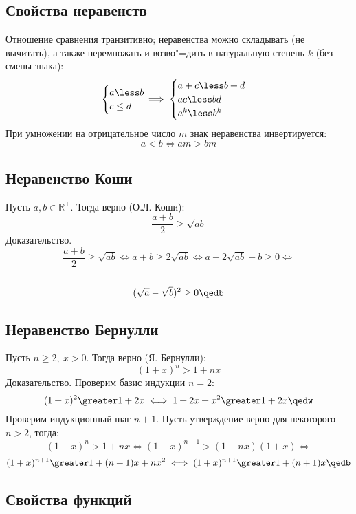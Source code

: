 \subsection{Свойства неравенств}

Отношение сравнения {\ital транзитивно}; неравенства можно {\ital складывать}
{\ital\color{desc}(не вычитать)}, а также {\ital перемножать} и возво"=дить
в натуральную степень $k$ {\ital\color{desc}(без смены знака)}:
$$
\begin{cases}
a\less b\\
c\leq d
\end{cases}\hspace*{-12pt}\implies
\begin{cases}
a + c\less b + d\\
ac\less bd\\
a^k\less b^k
\end{cases}
$$
При умножении на отрицательное число $m$ знак неравенства {\ital инвертируется}:
$$a\less b\iff am\greater bm$$

\subsection{Неравенство Коши}

Пусть $a,b\in \mathbb{R}^+$. Тогда верно {\ital\color{desc}(О.Л. Коши)}:
$$\frac{a+b}{2}\geq \sqrt{ab}$$
{\bold Доказательство.}
$$\frac{a+b}{2}\geq \sqrt{ab}\iff a+b\geq 2\sqrt{ab}\iff a-2\sqrt{ab}+b\geq 0\iff$$
\\[-11pt]
$$(\sqrt{a}-\sqrt{b})^2\geq 0\qedb$$

\subsection{Неравенство Бернулли}

Пусть $n\geq 2,\ x\greater 0$. Тогда верно {\ital\color{desc}(Я. Бернулли)}:
$$(1+x)^n\greater 1+nx$$
{\bold Доказательство.} Проверим базис индукции $n=2$:
$$(1+x)^2\greater 1+2x\iff 1+2x+x^2\greater 1+2x\qedw$$
Проверим индукционный шаг $n+1$. Пусть утверждение верно для некоторого
$n\greater 2$, тогда:
$$(1+x)^n\greater 1+nx\iff (1+x)^{n+1}\greater (1+nx)(1+x)\iff$$
$$(1+x)^{n+1}\greater 1+(n+1)x+nx^2\iff (1+x)^{n+1}\greater 1+(n+1)x\qedb$$

\subsection{Свойства функций}

